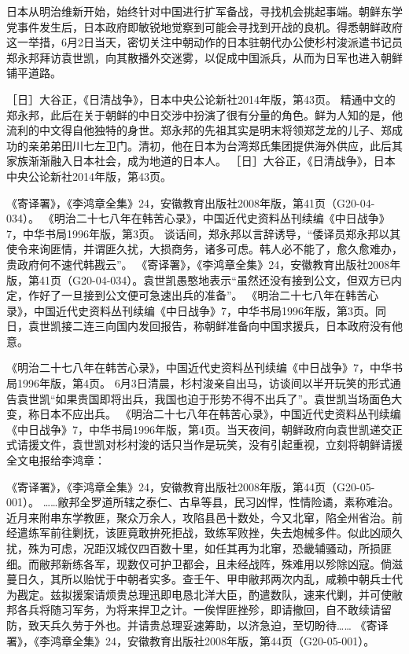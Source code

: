 \documentclass[12pt,UTF8]{ctexbook}
\begin{document}
日本从明治维新开始，始终针对中国进行扩军备战，寻找机会挑起事端。朝鲜东学党事件发生后，日本政府即敏锐地觉察到可能会寻找到开战的良机。得悉朝鲜政府这一举措，6月2日当天，密切关注中朝动作的日本驻朝代办公使杉村浚派遣书记员郑永邦拜访袁世凯，向其散播外交迷雾，以促成中国派兵，从而为日军也进入朝鲜铺平道路。

［日］大谷正，《日清战争》，日本中央公论新社2014年版，第43页。
精通中文的郑永邦，此后在关于朝鲜的中日交涉中扮演了很有分量的角色。鲜为人知的是，他流利的中文得自他独特的身世。郑永邦的先祖其实是明末将领郑芝龙的儿子、郑成功的亲弟弟田川七左卫门。清初，他在日本为台湾郑氏集团提供海外供应，此后其家族渐渐融入日本社会，成为地道的日本人。 ［日］大谷正，《日清战争》，日本中央公论新社2014年版，第43页。

《寄译署》，《李鸿章全集》24，安徽教育出版社2008年版，第41页（G20-04-034）。
《明治二十七八年在韩苦心录》，中国近代史资料丛刊续编《中日战争》7，中华书局1996年版，第3页。
谈话间，郑永邦以言辞诱导，“倭译员郑永邦以其使令来询匪情，并谓匪久扰，大损商务，诸多可虑。韩人必不能了，愈久愈难办，贵政府何不速代韩戡云”。 《寄译署》，《李鸿章全集》24，安徽教育出版社2008年版，第41页（G20-04-034）。袁世凯愚憨地表示“虽然还没有接到公文，但双方已内定，作好了一旦接到公文便可急速出兵的准备”。 《明治二十七八年在韩苦心录》，中国近代史资料丛刊续编《中日战争》7，中华书局1996年版，第3页。同日，袁世凯接二连三向国内发回报告，称朝鲜准备向中国求援兵，日本政府没有他意。

《明治二十七八年在韩苦心录》，中国近代史资料丛刊续编《中日战争》7，中华书局1996年版，第4页。
6月3日清晨，杉村浚亲自出马，访谈间以半开玩笑的形式通告袁世凯“如果贵国即将出兵，我国也迫于形势不得不出兵了”。袁世凯当场面色大变，称日本不应出兵。 《明治二十七八年在韩苦心录》，中国近代史资料丛刊续编《中日战争》7，中华书局1996年版，第4页。当天夜间，朝鲜政府向袁世凯递交正式请援文件，袁世凯对杉村浚的话只当作是玩笑，没有引起重视，立刻将朝鲜请援全文电报给李鸿章：

《寄译署》，《李鸿章全集》24，安徽教育出版社2008年版，第44页（G20-05-001）。
……敝邦全罗道所辖之泰仁、古阜等县，民习凶悍，性情险谲，素称难治。近月来附串东学教匪，聚众万余人，攻陷县邑十数处，今又北窜，陷全州省治。前经遣练军前往剿抚，该匪竟敢拚死拒战，致练军败挫，失去炮械多件。似此凶顽久扰，殊为可虑，况距汉城仅四百数十里，如任其再为北窜，恐畿辅骚动，所损匪细。而敝邦新练各军，现数仅可护卫都会，且未经战阵，殊难用以殄除凶寇。倘滋蔓日久，其所以贻忧于中朝者实多。查壬午、甲申敝邦两次内乱，咸赖中朝兵士代为戡定。兹拟援案请烦贵总理迅即电恳北洋大臣，酌遣数队，速来代剿，并可使敝邦各兵将随习军务，为将来捍卫之计。一俟悍匪挫殄，即请撤回，自不敢续请留防，致天兵久劳于外也。并请贵总理妥速筹助，以济急迫，至切盼待…… 《寄译署》，《李鸿章全集》24，安徽教育出版社2008年版，第44页（G20-05-001）。
\end{document}
